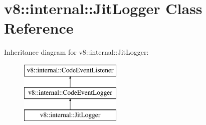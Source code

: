\hypertarget{classv8_1_1internal_1_1_jit_logger}{}\section{v8\+:\+:internal\+:\+:Jit\+Logger Class Reference}
\label{classv8_1_1internal_1_1_jit_logger}
Inheritance diagram for v8\+:\+:internal\+:\+:Jit\+Logger\+:\begin{figure}[H]
\begin{center}
\leavevmode
\includegraphics[height=3.000000cm]{classv8_1_1internal_1_1_jit_logger}
\end{center}
\end{figure}
